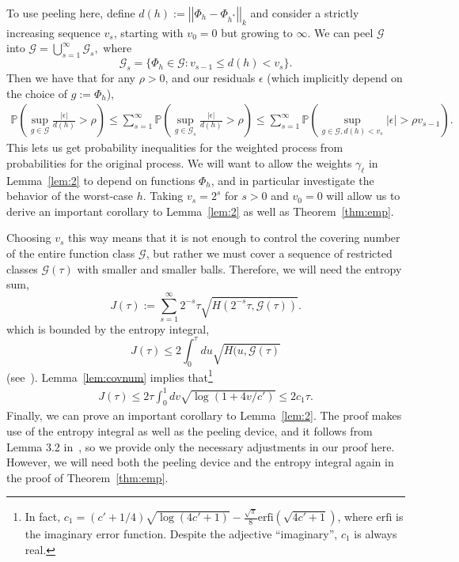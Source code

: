 \documentclass[11pt]{article}
\newcommand{\G}{\mathcal{G}}
\renewcommand{\P}{\mathbb{P}}
\newcommand{\vnorm}[1]{\left|\left| #1 \right|\right|}
\begin{document}
To use peeling here, define $d(h) := \vnorm{\Phi_h - \Phi_{h^*}}_k$ and
consider a strictly increasing sequence $v_s$, starting with $v_0=0$ but
growing to $\infty$. We can peel $\G$ into $\G = \bigcup_{s=1}^\infty{\G_s},$
where $$\G_s = \{\Phi_h \in \G : v_{s-1} \leq d(h) < v_s \}.$$ Then we have
that for any $\rho>0$, and our residuals $\epsilon$ (which implicitly depend on
the choice of $g := \Phi_h$),
\begin{align*}
  \P\left(\sup_{g \in \G} \frac{|\epsilon|}{d(h)} >
      \rho\right)
  \leq \sum_{s=1}^\infty \P \left( \sup_{g \in \G_s}
    \frac{|\epsilon|}{d(h)} > \rho \right)
  \leq \sum_{s=1}^\infty \P \left( \sup_{g \in \G, d(h)< v_s} |\epsilon| >
    \rho v_{s-1}\right).
\end{align*}
This lets us get probability inequalities for the weighted process from
probabilities for the original process. We will want to allow the weights
$\gamma_\ell$ in Lemma~\ref{lem:2} to depend on functions $\Phi_h$, and in
particular investigate the behavior of the worst-case $h$. Taking $v_s=2^s$ for
$s>0$ and $v_0=0$ will allow us to derive an important corollary to
Lemma~\ref{lem:2} as well as Theorem~\ref{thm:emp}.

Choosing $v_s$ this way means that it is not enough to control the covering
number of the entire function class $\G$, but rather we must cover a sequence
of restricted classes $\G(\tau)$ with smaller and smaller balls. Therefore, we
will need the entropy sum,
\begin{equation*}
  \label{eq:24}
  J(\tau) := \sum_{s=1}^\infty{2^{-s}\tau \sqrt{ H(2^{-s}\tau, \G(\tau))}}.
\end{equation*}
which is bounded by the entropy integral,
\begin{equation*}
  \label{eq:25}
  J(\tau) \leq 2\int_0^\tau{du\sqrt{H(u,\mathcal{G}(\tau)}}
\end{equation*}
(see~\citep[p. 29]{Geer2000}).  Lemma~\ref{lem:covnum} implies that\footnote{In
  fact, $c_1=(c'+1/4)\sqrt{\log (4c'+1)} -
  \frac{\sqrt{\pi}}{8}\mbox{erfi}(\sqrt{4c'+1} )$, where $\mbox{erfi}$ is the
  imaginary error function. Despite the adjective ``imaginary'', $c_1$ is
  always real.}
\begin{align*}
  \label{eq:12}
  J(\tau) \leq 2\tau \int_0^1{dv \sqrt{\log(1+4v/c')}} \leq 2c_1\tau.
\end{align*}
Finally, we can prove an important corollary to Lemma~\ref{lem:2}. The proof
makes use of the entropy integral as well as the peeling device, and it follows
from Lemma 3.2 in~\citet{Geer2000}, so we provide only the necessary
adjustments in our proof here. However, we will need both the peeling device
and the entropy integral again in the proof of Theorem~\ref{thm:emp}.
\end{document}
